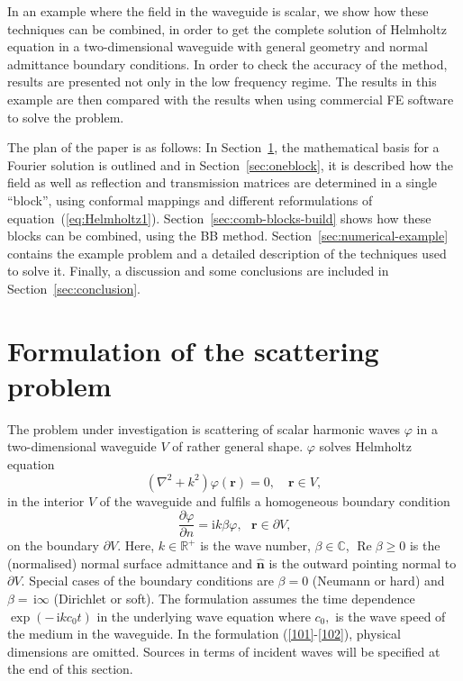 \documentclass[numreferences]{kluwer}
\renewcommand{\phi}{\varphi}
\renewcommand{\Re}{\operatorname{Re}}
\renewcommand{\i}{\,\mathrm{i}}
\begin{document}
In an example where the field in the waveguide is scalar, we show how
these techniques can be combined, in order to get the complete
solution of Helmholtz equation in a two-dimensional waveguide with
general geometry and normal admittance boundary conditions. In order
to check the accuracy of the method, results are presented not only in
the low frequency regime.  The results in this example are then
compared with the results when using commercial FE software to solve
the problem.

The plan of the paper is as follows: In Section~\ref{sec:prel}, the
mathematical basis for a Fourier solution is outlined and in
Section~\ref{sec:oneblock}, it is described how the field as well as
reflection and transmission matrices are determined in a single
``block'', using conformal mappings and different reformulations of
equation~(\ref{eq:Helmholtz1}).  Section~\ref{sec:comb-blocks-build}
shows how these blocks can be combined, using the BB
method. Section~\ref{sec:numerical-example} contains the example
problem and a detailed description of the techniques used to solve
it. Finally, a discussion and some conclusions are included in
Section~\ref{sec:conclusion}.


\section{Formulation of the scattering problem}
\label{sec:prel}


The problem under investigation is scattering of scalar harmonic waves
$\phi$ in a two-dimensional waveguide $V$ of rather general
shape. $\phi$ solves Helmholtz equation%
\begin{equation}
  (\nabla^{2}+k^{2})\phi(\bm{r})=0,\quad\bm{r}\in V, \label{101}%
\end{equation}
in the interior $V$ of the waveguide and fulfils a homogeneous
boundary condition%
\begin{equation}
  \dfrac{\partial \phi}{\partial n}=\text{i}k\beta \phi,
  \text{ }\bm{r}\in\partial V\text{,} \label{102}%
\end{equation}
on the boundary $\partial V$. Here, $k\in\mathbb{R}^{+}$ is the wave
number, $\beta\in\mathbb{C}$, $\Re\beta\geq0$ is the (normalised)
normal surface admittance and $\widehat{\bm{n}}$ is the outward
pointing normal to $\partial V$. Special cases of the boundary
conditions are $\beta=0$ (Neumann or hard) and $\beta=\i\infty$
(Dirichlet or soft). The formulation assumes the time dependence
$\exp(-\i kc_{0}t)$ in the underlying wave equation where $c_{0},$ is
the wave speed of the medium in the waveguide.  In the formulation
(\ref{101}-\ref{102}), physical dimensions are omitted.  Sources in
terms of incident waves will be specified at the end of this section.
\end{document}
